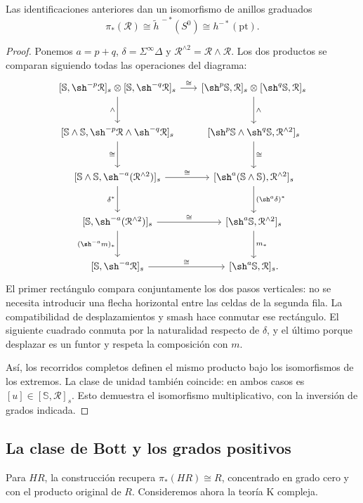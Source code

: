 \begin{prop}\label{prop:c25-coeficientes-anillo}
Las identificaciones anteriores dan un isomorfismo de anillos graduados
\[
\pi_*(\mathcal R)\cong\widetilde h^{\,-*}(S^0)\cong h^{-*}(\mathrm{pt}).
\]
\end{prop}
\begin{proof}
Ponemos $a=p+q$, $\delta=\Sigma^\infty\Delta$ y $\mathcal R^{\wedge2}=\mathcal R\wedge\mathcal R$. Los dos productos se comparan siguiendo todas las operaciones del diagrama:
\[
\begin{tikzcd}[column sep=1.7em,row sep=large,ampersand replacement=\&]
{[\mathbb S,\sh^{-p}\mathcal R]_s}\otimes{[\mathbb S,\sh^{-q}\mathcal R]_s}
 \arrow[r,"\cong"]\arrow[d,"\wedge"']\&
{[\sh^p\mathbb S,\mathcal R]_s}\otimes{[\sh^q\mathbb S,\mathcal R]_s}\arrow[d,"\wedge"]\\
{[\mathbb S\wedge\mathbb S,\sh^{-p}\mathcal R\wedge\sh^{-q}\mathcal R]_s}\arrow[d,"\cong"']\&
{[\sh^p\mathbb S\wedge\sh^q\mathbb S,\mathcal R^{\wedge2}]_s}\arrow[d,"\cong"]\\
{[\mathbb S\wedge\mathbb S,\sh^{-a}(\mathcal R^{\wedge2})]_s}
 \arrow[r,"\cong"]\arrow[d,"\delta^*"']\&
{[\sh^a(\mathbb S\wedge\mathbb S),\mathcal R^{\wedge2}]_s}\arrow[d,"(\sh^a\delta)^*"]\\
{[\mathbb S,\sh^{-a}(\mathcal R^{\wedge2})]_s}
 \arrow[r,"\cong"]\arrow[d,"(\sh^{-a}m)_*"']\&
{[\sh^a\mathbb S,\mathcal R^{\wedge2}]_s}\arrow[d,"m_*"]\\
{[\mathbb S,\sh^{-a}\mathcal R]_s}\arrow[r,"\cong"]\&{[\sh^a\mathbb S,\mathcal R]_s}.
\end{tikzcd}
\]
El primer rectángulo compara conjuntamente los dos pasos verticales: no se necesita introducir una flecha horizontal entre las celdas de la segunda fila. La compatibilidad de desplazamientos y smash hace conmutar ese rectángulo. El siguiente cuadrado conmuta por la naturalidad respecto de $\delta$, y el último porque desplazar es un funtor y respeta la composición con $m$.

Así, los recorridos completos definen el mismo producto bajo los isomorfismos de los extremos. La clase de unidad también coincide: en ambos casos es $[u]\in[\mathbb S,\mathcal R]_s$. Esto demuestra el isomorfismo multiplicativo, con la inversión de grados indicada.
\end{proof}

\subsection{La clase de Bott y los grados positivos}
Para $HR$, la construcción recupera $\pi_*(HR)\cong R$, concentrado en grado cero y con el producto original de $R$. Consideremos ahora la teoría K compleja.

